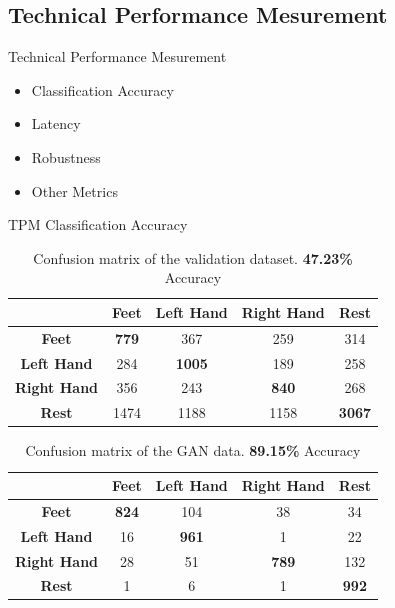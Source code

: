 \subsection*{Technical Performance Mesurement}
\begin{frame}{Technical Performance Mesurement}
    \begin{itemize}
        \item Classification Accuracy
        \item Latency
        \item Robustness
        \item Other Metrics
    \end{itemize}
\end{frame}

\begin{frame}{TPM \textemdash{} Classification Accuracy}

\begin{table}[!htbp]
    \centering
    \begin{tabular}{|c||c|c|c|c|}
        \hline
        & \textbf{Feet} & \textbf{Left Hand} & \textbf{Right Hand} & \textbf{Rest} \\
        \hline
        \hline
        \textbf{Feet} & \textbf{779} & 367 & 259 & 314 \\
        \hline
        \textbf{Left Hand} & 284 & \textbf{1005} & 189 & 258 \\
        \hline
        \textbf{Right Hand} & 356 & 243 & \textbf{840} & 268 \\
        \hline
        \textbf{Rest} & 1474 & 1188 & 1158 & \textbf{3067} \\
        \hline
    \end{tabular}
    \caption{Confusion matrix of the validation dataset. \textbf{47.23\%} Accuracy}
\end{table}
\begin{table}[!htbp]
    \centering
    \begin{tabular}{|c||c|c|c|c|}
        \hline
        & \textbf{Feet} & \textbf{Left Hand} & \textbf{Right Hand} & \textbf{Rest} \\
        \hline
        \hline
        \textbf{Feet} & \textbf{824} & 104 & 38 & 34 \\
        \hline
        \textbf{Left Hand} & 16 & \textbf{961} & 1 & 22 \\
        \hline
        \textbf{Right Hand} & 28 & 51 & \textbf{789} & 132 \\
        \hline
        \textbf{Rest} & 1 & 6 & 1 & \textbf{992} \\
        \hline
    \end{tabular}
    \caption{Confusion matrix of the GAN data. \textbf{89.15\%} Accuracy}
\end{table}

\end{frame}
